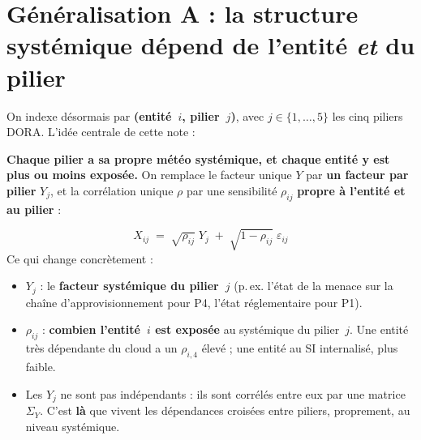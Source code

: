 \documentclass[11pt,a4paper]{article}
\newcommand{\Y}{Y}
\newcommand{\eps}{\varepsilon}
\begin{document}
\section{Généralisation A : la structure systémique dépend de l'entité \emph{et} du pilier}

On indexe désormais par \textbf{(entité~$i$, pilier~$j$)}, avec $j\in\{1,\dots,5\}$ les cinq
piliers DORA. L'idée centrale de cette note :

\begin{cle}
\textbf{Chaque pilier a sa propre \og{}météo systémique\fg{}, et chaque entité y est plus ou
moins exposée.} On remplace le facteur unique $\Y$ par \textbf{un facteur par pilier} $\Y_j$,
et la corrélation unique $\rho$ par une sensibilité $\rho_{ij}$ \textbf{propre à l'entité et
au pilier} :
\end{cle}

\begin{equation}
\boxed{\;X_{ij} \;=\; \sqrt{\rho_{ij}}\;\Y_j \;+\; \sqrt{1-\rho_{ij}}\;\eps_{ij}\;}
\end{equation}
Ce qui change concrètement :
\begin{itemize}[leftmargin=1.4em,itemsep=1pt]
\item $\Y_j$ : le \textbf{facteur systémique du pilier~$j$} (p.\,ex. l'état de la menace
  sur la chaîne d'approvisionnement pour P4, l'état réglementaire pour P1).
\item $\rho_{ij}$ : \textbf{combien l'entité~$i$ est exposée} au systémique du pilier~$j$. Une
  entité très dépendante du cloud a un $\rho_{i,4}$ élevé ; une entité au SI internalisé,
  plus faible.
\item Les $\Y_j$ ne sont pas indépendants : ils sont corrélés entre eux par une matrice
  $\Sigma_Y$. C'est \textbf{là} que vivent les \og{}dépendances croisées\fg{} entre piliers,
  proprement, au niveau systémique.
\end{itemize}
\end{document}
